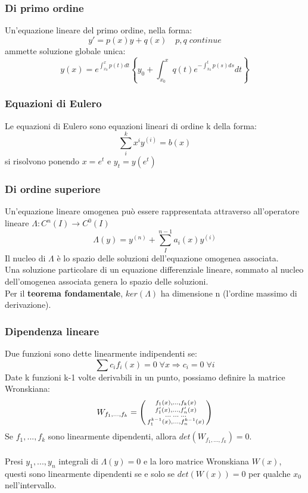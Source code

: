 \documentclass{article}
\begin{document}
\subsubsection{Di primo ordine}
Un'equazione lineare del primo ordine, nella forma:
$$ y'=p(x)y+q(x)\quad p,q\;continue$$
ammette soluzione globale unica:
$$ y(x)=e^{\int_{x_0}^xp(t)dt}\left\{ y_0+\int_{x_0}^xq(t)e^{-\int_{x_0}^tp(s)ds}dt \right\} $$

\subsubsection{Equazioni di Eulero}
Le equazioni di Eulero sono equazioni lineari di ordine k della forma:
$$ \sum_i^k x^iy^{(i)} =b(x)$$
si risolvono ponendo $x=e^t$ e $y_t=y(e^t)$

\subsubsection{Di ordine superiore}
Un'equazione lineare omogenea può essere rappresentata attraverso all'operatore lineare $\Lambda: C^n(I)\rightarrow C^0(I)$
$$ \Lambda(y)=y^{(n)}+ \sum_I^{n-1}a_i(x)y^{(i)}$$
Il nucleo di $\Lambda$ è lo spazio delle soluzioni dell'equazione omogenea associata.\\
Una soluzione particolare di un equazione differenziale lineare, sommato al nucleo dell'omogenea associata genera lo spazio delle soluzioni.\\
Per il \textbf{teorema fondamentale}, $ker(\Lambda)$ ha dimensione n (l'ordine massimo di derivazione).

\subsubsection{Dipendenza lineare}
Due funzioni sono dette linearmente indipendenti se:
$$ \sum c_if_i(x)=0\;\forall x\Rightarrow c_i=0\;\forall i $$
Date k funzioni k-1 volte derivabili in un punto, possiamo definire la matrice Wronskiana:
$$W_{f_1,...,f_k}=\begin{psmallmatrix} f_1(x),...,f_k(x)\\f'_1(x),...,f'_n(x)\\...\;...\;...\\f_1^{k-1}(x),...,f_n^{k-1}(x) \end{psmallmatrix}$$
Se $f_1,...,f_k$ sono linearmente dipendenti, allora $det(W_{f_1,...,f_k})=0$.\\\\
Presi $y_1,...,y_n$ integrali di $\Lambda(y)=0$ e la loro matrice Wronskiana $W(x)$, questi sono linearmente dipendenti se e solo se $det(W(x))=0$ per qualche $x_0$ nell'intervallo.
\end{document}
